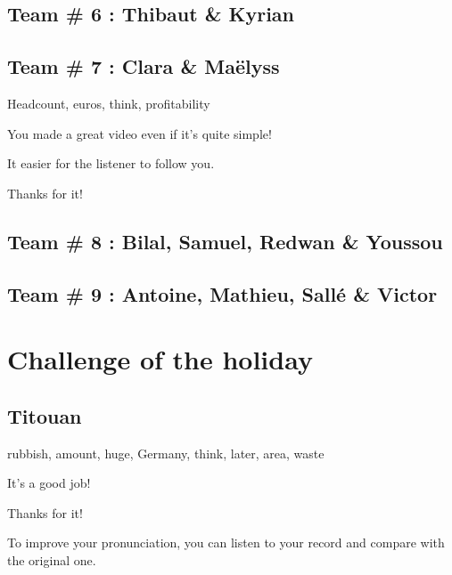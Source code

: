\documentclass[12pt,oneside]{report}
\begin{document}
\begin{spacing}{1.2}
\subsection*{Team \# 6 : Thibaut \& Kyrian}

\color{blue}

\color{black}

\subsection*{Team \# 7 : Clara \& Maëlyss}

Headcount, euros, think, profitability

\color{blue}
You made a great video even if it's quite simple! 

It easier for the listener to follow you.

Thanks for it!
\color{black}

\subsection*{Team \# 8 : Bilal, Samuel, Redwan \& Youssou}

\color{blue}

\color{black}

\subsection*{Team \# 9 : Antoine, Mathieu, Sallé \& Victor}

\color{blue}

\color{black}




\section{Challenge of the holiday}

\subsection*{Titouan}

rubbish, amount, huge, Germany, think, later, area, waste

\color{blue}
It's a good job!

Thanks for it!

To improve your pronunciation, you can listen to your record and compare with the original one.
\color{black}


\end{spacing}
\end{document}
